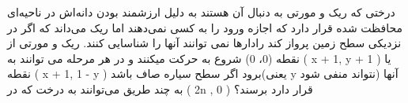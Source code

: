 \p
درختی که ریک و مورتی به دنبال آن هستند به دلیل ارزشمند بودن دانه‌اش در ناحیه‌ای محافظت شده قرار دارد که اجازه ورود را به کسی نمی‌دهند اما ریک می‌داند که اگر در نزدیکی سطح زمین پرواز کند رادارها نمی توانند آنها را شناسایی کنند. ریک  و مورتی از نقطه (0، 0) شروع به حرکت میکنند و در هر مرحله می توانند به ( x + 1, y + 1 )  یا نقطه ( x + 1, 1 - y ) برود اگر سطح سیاره صاف باشد(یعنی y نتواند منفی شود) آنها به چند طریق می‌توانند به درخت که در ( 2n , 0 ) قرار دارد برسند؟

